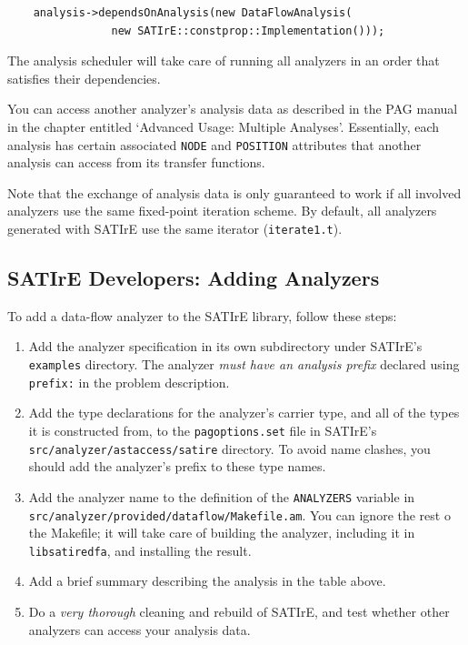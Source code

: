 \documentclass[a4paper,12pt]{report}
\begin{document}
\begin{verbatim}
    analysis->dependsOnAnalysis(new DataFlowAnalysis(
                new SATIrE::constprop::Implementation()));
\end{verbatim}

The analysis scheduler will take care of running all analyzers in an order
that satisfies their dependencies.

You can access another analyzer's analysis data as described in the PAG
manual in the chapter entitled `Advanced Usage: Multiple Analyses'.
Essentially, each analysis has certain associated \texttt{NODE} and
\texttt{POSITION} attributes that another analysis can access from its
transfer functions.

Note that the exchange of analysis data is only guaranteed to work if all
involved analyzers use the same fixed-point iteration scheme. By default,
all analyzers generated with SATIrE use the same iterator
(\texttt{iterate1.t}).

\subsection{SATIrE Developers: Adding Analyzers}
\label{sec:analysis_dataflow_add}

To add a data-flow analyzer to the SATIrE library, follow these steps:

\begin{enumerate}
\item Add the analyzer specification in its own subdirectory under SATIrE's
\texttt{examples} directory. The analyzer \emph{must have an analysis
prefix} declared using \texttt{prefix:} in the problem description.
\item Add the type declarations for the analyzer's carrier type, and all of
the types it is constructed from, to the \texttt{pagoptions.set} file in
SATIrE's \texttt{src/analyzer/astaccess/satire} directory. To avoid name
clashes, you should add the analyzer's prefix to these type names.
\item Add the analyzer name to the definition of the \texttt{ANALYZERS}
variable in \texttt{src/analyzer/provided/dataflow/Makefile.am}. You can
ignore the rest o the Makefile; it will take care of building the analyzer,
including it in \texttt{libsatiredfa}, and installing the result.
\item Add a brief summary describing the analysis in the table above.
\item Do a \emph{very thorough} cleaning and rebuild of SATIrE, and test
whether other analyzers can access your analysis data.
\end{enumerate}
\end{document}
